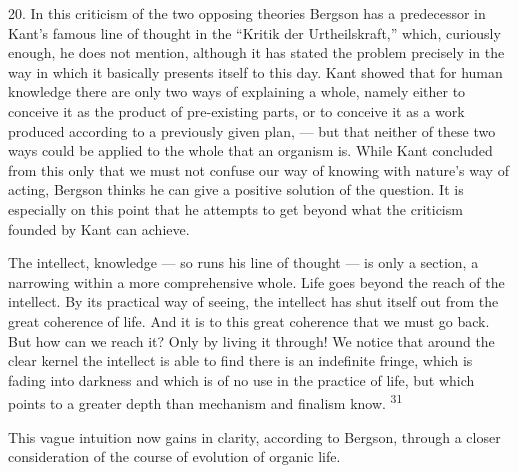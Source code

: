 \documentclass[12pt,a4paper,openany]{book}
\newcommand{\opage}[1]{\marginnote{\footnotesize\textit{[#1]}}}
\newcommand{\nm}[1]{\unskip\textsuperscript{#1}}
\begin{document}
20. In this criticism of the two opposing theories Bergson has a predecessor in Kant's famous line of thought in the ``Kritik der Urtheilskraft,'' which, curiously enough, he does not mention, although it has stated the problem precisely in the way in which it basically presents itself to this day. Kant showed that for human knowledge there are only two ways of explaining a whole, namely either to conceive it as the product of pre-existing parts, or to conceive it as a work produced according to a previously given plan, --- but that neither of these two ways could be applied to the whole that an organism is. While Kant concluded from this only that we must not confuse our way of
\opage{39}knowing with nature's way of acting, Bergson thinks he can give a positive solution of the question. It is especially on this point that he attempts to get beyond what the criticism founded by Kant can achieve.

The intellect, knowledge --- so runs his line of thought --- is only a section, a narrowing within a more comprehensive whole. Life goes beyond the reach of the intellect. By its practical way of seeing, the intellect has shut itself out from the great coherence of life. And it is to this great coherence that we must go back. But how can we reach it? Only by living it through! We notice that around the clear kernel the intellect is able to find there is an indefinite fringe, which is fading into darkness and which is of no use in the practice of life, but which points to a greater depth than mechanism and finalism know. \nm{31}

This vague intuition now gains in clarity, according to Bergson, through a closer consideration of the course of evolution of organic life.
\end{document}
